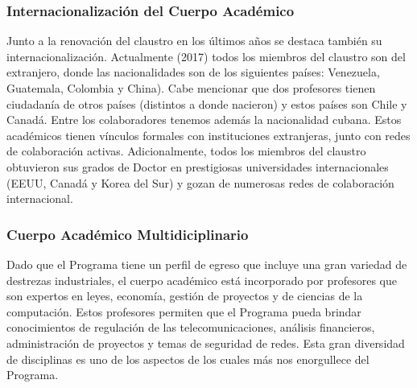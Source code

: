 \subsubsection{Internacionalización del Cuerpo Académico}
\label{internacionalizacion}

Junto a la renovación del claustro en los últimos
años se destaca también su internacionalización. Actualmente (2017) todos los miembros 
del claustro son del extranjero, donde las nacionalidades son de los siguientes países: Venezuela,
Guatemala, Colombia y China). Cabe mencionar que dos profesores tienen ciudadanía de otros países (distintos 
a donde nacieron) y estos países son Chile y Canadá. Entre los colaboradores tenemos además la nacionalidad cubana.
Estos académicos tienen vínculos formales con instituciones extranjeras, junto con redes
de colaboración activas. Adicionalmente, todos los miembros del claustro obtuvieron
sus grados de Doctor en prestigiosas universidades internacionales (EEUU, Canadá y Korea del Sur) 
y gozan de numerosas redes de colaboración internacional.

\subsubsection{Cuerpo Académico Multidiciplinario}

Dado que el Programa tiene un perfil de egreso que incluye una gran variedad de destrezas industriales,
el cuerpo académico está incorporado por profesores que son expertos en leyes, economía, gestión de 
proyectos y de ciencias de la computación. Estos profesores permiten que el Programa pueda brindar 
conocimientos de regulación de las telecomunicaciones, análisis financieros, administración de proyectos y
temas de seguridad de redes. Esta gran diversidad de disciplinas es uno de los aspectos de los cuales
más nos enorgullece del Programa.



